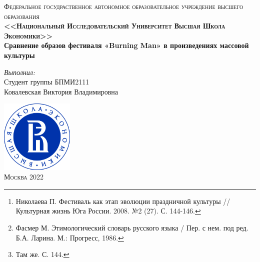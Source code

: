 \documentclass[10pt,a4paper]{report}
\begin{document}

\begin{titlepage}

\center 
 
\textsc{\large Федеральное госудраственное автономное образовательное учреждение высшего образования}\\[1.5cm]
\textsc{\Large \textbf{<<Национальный Исследовательский Университет Высшая Школа Экономики>>}}\\[4.4cm]

\huge \bfseries Сравнение образов фестиваля «Burning Man» в произведениях массовой культуры\\[1.4cm] 

\begin{flushleft} 
\normalsize
\emph{Выполнил:}\\
Студент группы БПМИ2111 \\
Ковалевская Виктория Владимировна \\[2cm]
\end{flushleft} 

\includegraphics[width=3.5cm, height=3.5cm]{images/logo.png}\\[1.5cm]

\textsc{\large Москва 2022}

\end{titlepage}

\begin{abstract}
Праздник как специфический аспект деятельности человека 
существует с момента зарождения культуры и наблюдается на
всех стадиях 
развития человеческой цивилизации, в любых географических или
экономических условиях\footnote{Николаева П. Фестиваль как этап эволюции
праздничной культуры // Культурная жизнь Юга России. 2008. №2 (27). С. 144-146.}.
В XIII веке возникает понятие «фестиваль»
(фр. festival; от лат. festivus — «праздничный»)\footnote{Фасмер М. 
Этимологический словарь русского языка / Пер. с нем. под ред. Б.А. Ларина. М.:
Прогресс, 1986.}. В современных 
социокультурных условиях это наиболее востребованный способ 
проведения массовых мероприятий с целью показа лучших достижений
искусства: музыкального, театрального, кино и т.п.\footnote{Там же. С. 144.}
Фестивали
занимают определенное место в обществе: в них участвует большое 
количество людей, на них обращают свое внимание СМИ, про них пишут 
книги и снимают фильмы. Один из таких фестивалей заинтересовал и 
меня.
\end{abstract}
\end{document}
